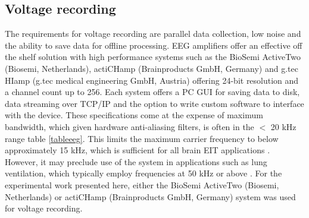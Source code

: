 \subsection{Voltage recording}
The requirements for voltage recording are parallel data collection, low noise and the ability to save data for offline processing. EEG amplifiers offer an effective off the shelf solution with high performance systems such as the BioSemi ActiveTwo (Biosemi, Netherlands), actiCHamp (Brainproducts GmbH, Germany) and g.tec HIamp (g.tec medical engineering GmbH, Austria) offering 24-bit resolution and a channel count up to 256. Each system offers a PC GUI for saving data to disk, data streaming over TCP/IP and the option to write custom software to interface with the device. These specifications come at the expense of maximum bandwidth, which given hardware anti-aliasing filters, is often in the $<$ 20 kHz range table \ref{tableeeg}. This limits the maximum carrier frequency to below approximately 15 kHz, which is sufficient for all brain EIT applications \label{table_requirements}. However, it may preclude use of the system in applications such as lung ventilation, which typically employ frequencies at 50 kHz or above \cite{Frerichs_2000}. For the experimental work presented here, either the BioSemi ActiveTwo (Biosemi, Netherlands) or actiCHamp (Brainproducts GmbH, Germany) system was used for voltage recording. 
